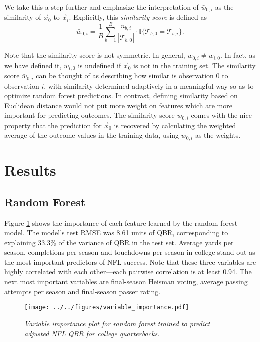 \documentclass[Review, sageh, times]{sagej}
\begin{document}
We take this a step further and emphasize the interpretation of $\bar w_{0,i}$ as the similarity of $\vec x_0$ to $\vec x_i$. Explicitly, this {\it similarity score} is defined as
\begin{equation}
  \label{eqn:similarity}
  \bar w_{0,i} = \frac{1}{B}\sum_{b = 1}^B
    \frac{n_{b,i}}{|\mathcal{T}_{b,0}|} \cdot \mathbb{I}\{\mathcal{T}_{b,0} = \mathcal{T}_{b,i}\}.
\end{equation}

Note that the similarity score is not symmetric. In general, $\bar w_{0,i} \ne \bar w_{i,0}$. In fact, as we have defined it, $\bar w_{i,0}$ is undefined if $\vec x_0$ is not in the training set. The similarity score $\bar w_{0,i}$ can be thought of as describing how similar is observation 0 to observation $i$, with similarity determined adaptively in a meaningful way so as to optimize random forest predictions. In contrast, defining similarity based on Euclidean distance would not put more weight on features which are more important for predicting outcomes. The similarity score $\bar w_{0,i}$ comes with the nice property that the prediction for $\vec x_0$ is recovered by calculating the weighted average of the outcome values in the training data, using $\bar w_{0,i}$ as the weights.

\section{Results}
\label{sec:results}
\subsection{Random Forest}
Figure \ref{fig:importance} shows the importance of each feature learned by the random forest model. The model's test RMSE was 8.61 units of QBR, corresponding to explaining 33.3\% of the variance of QBR in the test set. Average yards per season, completions per season and touchdowns per season in college stand out as the most important predictors of NFL success. Note that these three variables are highly correlated with each other---each pairwise correlation is at least 0.94. The next most important variables are final-season Heisman voting, average passing attempts per season and final-season passer rating.

\begin{figure}[H]
    \centering
    \texttt{[image: ../../figures/variable\_importance.pdf]}
    \caption{\textit{Variable importance plot for random forest trained to predict adjusted NFL QBR for college quarterbacks.}}
    \label{fig:importance}
\end{figure}
\end{document}
